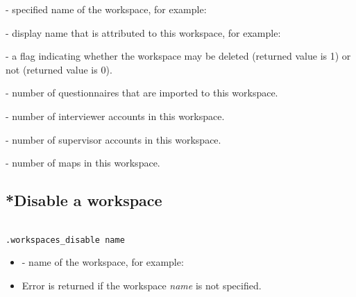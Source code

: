 \savedres
\begin{compactitem}

    \item {} - specified name of the workspace,
          for example:

    \item {} - display name that is
          attributed to this workspace, for example:

    \item {} - a flag indicating whether the
          workspace may be deleted (returned value is 1) or not (returned value
          is 0).

    \item {} - number of
          questionnaires that are imported to this workspace.

    \item {} - number of interviewer accounts
          in this workspace.

    \item {} - number of supervisor accounts in
          this workspace.

    \item {} - number of maps in this workspace.

\end{compactitem}


\subsection{*Disable a workspace}

\begin{lstlisting}[style=CommandLineStyle, showlines=true]

.workspaces_disable name

\end{lstlisting}

\paramsheader
\begin{itemize}

    \item {} - name of the workspace, for example:

\end{itemize}

\errheader
\begin{itemize}
    \item Error  is returned if the workspace \textit{name} is
    not specified.
\end{itemize}


